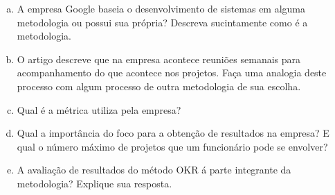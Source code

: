 \begin{enumerate}[a)]
\item A empresa Google baseia o desenvolvimento de sistemas em alguma
  metodologia ou possui sua própria? Descreva sucintamente como é a
  metodologia.
\item O artigo descreve que na empresa acontece reuniões semanais para
  acompanhamento do que acontece nos projetos. Faça uma analogia deste
  processo com algum processo de outra metodologia de sua escolha.
\item Qual é a métrica utiliza pela empresa?
\item Qual a importância do foco para a obtenção de resultados na
  empresa?  E qual o número máximo de projetos que um funcionário pode
  se envolver?
\item A avaliação de resultados do método OKR á parte integrante
  da metodologia? Explique sua resposta.
\end{enumerate}



\newpage

